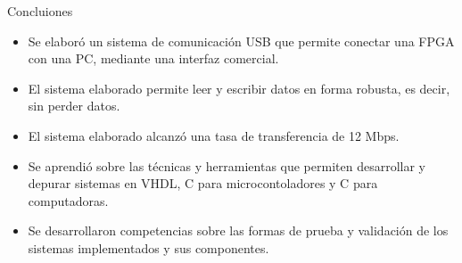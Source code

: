 \begin{frame}{Concluiones}
	\begin{itemize}
		\item Se elaboró un sistema de comunicación USB que permite conectar una FPGA con una PC, mediante una interfaz comercial.
		\item El sistema elaborado permite leer y escribir datos en forma robusta, es decir, sin perder datos.
		\item El sistema elaborado alcanzó una tasa de transferencia de 12 Mbps.
		\item Se aprendió sobre las técnicas y herramientas que permiten desarrollar y depurar sistemas en VHDL, C para microcontoladores y C para computadoras.
		\item Se desarrollaron competencias sobre las formas de prueba y validación de los sistemas implementados y sus componentes.
	\end{itemize}
\end{frame}
